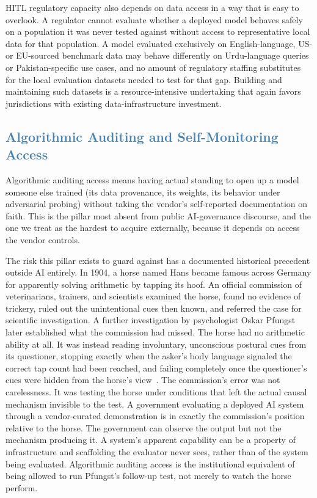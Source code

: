 \documentclass[journal]{IEEEtran}
\begin{document}
HITL regulatory capacity also depends on data access in a way that is easy to overlook. A regulator cannot evaluate whether a deployed model behaves safely on a population it was never tested against without access to representative local data for that population. A model evaluated exclusively on English-language, US- or EU-sourced benchmark data may behave differently on Urdu-language queries or Pakistan-specific use cases, and no amount of regulatory staffing substitutes for the local evaluation datasets needed to test for that gap.
Building and maintaining such datasets is a resource-intensive undertaking that again favors jurisdictions with existing data-infrastructure investment.

\subsection{\textcolor{steelblue}{Algorithmic Auditing and Self-Monitoring Access}}

Algorithmic auditing access means having actual standing to open up a model someone else trained (its data provenance, its weights, its behavior under adversarial probing) without taking the vendor's self-reported documentation on faith. This is the pillar most absent from public AI-governance discourse, and the one we treat as the hardest to acquire externally, because it depends on access the vendor controls.

The risk this pillar exists to guard against has a documented historical precedent outside AI entirely. In 1904, a horse named Hans became famous across Germany for apparently solving arithmetic by tapping its hoof. An official commission of veterinarians, trainers, and scientists examined the horse, found no evidence of trickery, ruled out the unintentional cues then known, and referred the case for scientific investigation. A further investigation by psychologist Oskar Pfungst later established what the commission had missed. The horse had no arithmetic ability at all. It was instead reading involuntary, unconscious postural cues from its questioner, stopping exactly when the asker's body language signaled the correct tap count had been reached, and failing completely once the questioner's cues were hidden from the horse's view~\cite{pfungst1911cleverhans}.
The commission's error was not carelessness. It was testing the horse under conditions that left the actual causal mechanism invisible to the test. A government evaluating a deployed AI system through a vendor-curated demonstration is in exactly the commission's position relative to the horse. The government can observe the output but not the mechanism producing it. A system's apparent capability can be a property of infrastructure and scaffolding the evaluator never sees, rather than of the system being evaluated. Algorithmic auditing access is the institutional equivalent of being allowed to run Pfungst's follow-up test, not merely to watch the horse perform.
\end{document}
